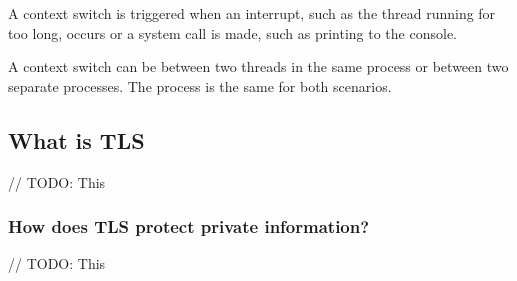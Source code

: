 \documentclass{article}
\begin{document}
A context switch is triggered when an interrupt, such as the thread
running for too long, occurs or a system call is made, such as printing
to the console.

A context switch can be between two threads in the same process or between
two separate processes. The process is the same for both scenarios.



\subsection{What is TLS}
// TODO: This
    \subsubsection{How does TLS protect private information?}
    // TODO: This
\end{document}
